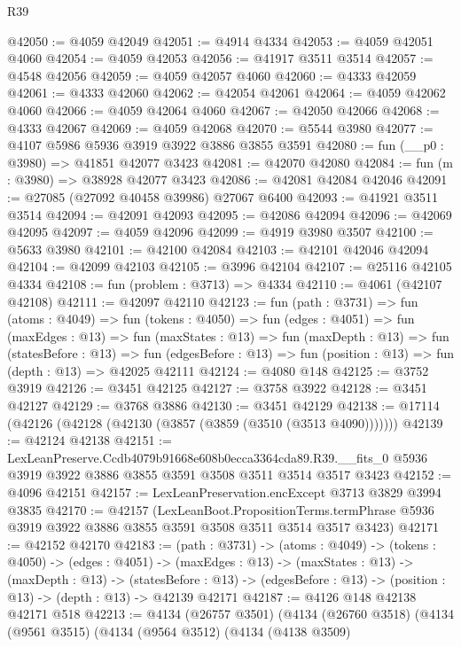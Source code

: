 \begin{lexlean}{R39}
\begin{coremodule}
@42050 := @4059 @42049
@42051 := @4914 @4334
@42053 := @4059 @42051 @4060
@42054 := @4059 @42053
@42056 := @41917 @3511 @3514
@42057 := @4548 @42056
@42059 := @4059 @42057 @4060
@42060 := @4333 @42059
@42061 := @4333 @42060
@42062 := @42054 @42061
@42064 := @4059 @42062 @4060
@42066 := @4059 @42064 @4060
@42067 := @42050 @42066
@42068 := @4333 @42067
@42069 := @4059 @42068
@42070 := @5544 @3980
@42077 := @4107 @5986 @5936 @3919 @3922 @3886 @3855 @3591
@42080 := fun (__p0 : @3980) => @41851 @42077 @3423
@42081 := @42070 @42080
@42084 := fun (m : @3980) => @38928 @42077 @3423
@42086 := @42081 @42084 @42046
@42091 := @27085 (@27092 @40458 @39986) @27067 @6400
@42093 := @41921 @3511 @3514
@42094 := @42091 @42093
@42095 := @42086 @42094
@42096 := @42069 @42095
@42097 := @4059 @42096
@42099 := @4919 @3980 @3507
@42100 := @5633 @3980
@42101 := @42100 @42084
@42103 := @42101 @42046 @42094
@42104 := @42099 @42103
@42105 := @3996 @42104
@42107 := @25116 @42105 @4334
@42108 := fun (problem : @3713) => @4334
@42110 := @4061 (@42107 @42108)
@42111 := @42097 @42110
@42123 := fun (path : @3731) =>
  fun (atoms : @4049) =>
  fun (tokens : @4050) =>
  fun (edges : @4051) =>
  fun (maxEdges : @13) =>
  fun (maxStates : @13) =>
  fun (maxDepth : @13) =>
  fun (statesBefore : @13) =>
  fun (edgesBefore : @13) => fun (position : @13) => fun (depth : @13) => @42025 @42111
@42124 := @4080 @148
@42125 := @3752 @3919
@42126 := @3451 @42125
@42127 := @3758 @3922
@42128 := @3451 @42127
@42129 := @3768 @3886
@42130 := @3451 @42129
@42138 := @17114 (@42126 (@42128 (@42130 (@3857 (@3859 (@3510 (@3513 @4090)))))))
@42139 := @42124 @42138
@42151 := LexLeanPreserve.Ccdb4079b91668e608b0ecca3364cda89.R39.__fits_0
    @5936
    @3919
    @3922
    @3886
    @3855
    @3591
    @3508
    @3511
    @3514
    @3517
    @3423
@42152 := @4096 @42151
@42157 := LexLeanPreservation.encExcept @3713 @3829 @3994 @3835
@42170 := @42157
    (LexLeanBoot.PropositionTerms.termPhrase
      @5936
      @3919
      @3922
      @3886
      @3855
      @3591
      @3508
      @3511
      @3514
      @3517
      @3423)
@42171 := @42152 @42170
@42183 := (path : @3731) ->
  (atoms : @4049) ->
  (tokens : @4050) ->
  (edges : @4051) ->
  (maxEdges : @13) ->
  (maxStates : @13) ->
  (maxDepth : @13) ->
  (statesBefore : @13) -> (edgesBefore : @13) -> (position : @13) -> (depth : @13) -> @42139 @42171
@42187 := @4126 @148 @42138 @42171 @518
@42213 := @4134
    (@26757 @3501)
    (@4134
      (@26760 @3518)
      (@4134
        (@9561 @3515)
        (@4134
          (@9564 @3512)
          (@4134
            (@4138 @3509)

\end{coremodule}
\end{lexlean}

